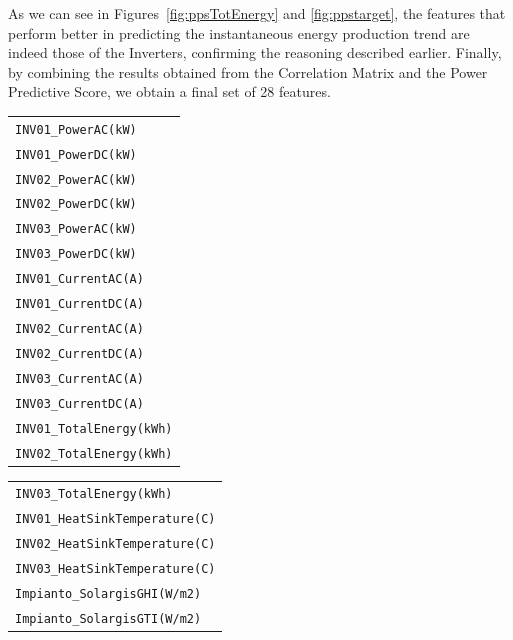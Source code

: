 As we can see in Figures~\ref{fig:ppsTotEnergy} and \ref{fig:ppstarget}, the features
that perform better in predicting the instantaneous energy production trend are
indeed those of the Inverters, confirming the reasoning described earlier.
Finally, by combining the results obtained from the Correlation Matrix and the
Power Predictive Score, we obtain a final set of 28 features.

%
\begin{table}[H]
	\begin{center}
		\begin{tabular}[c]{l|}
			\verb|INV01_PowerAC(kW)|      \\
			\verb|INV01_PowerDC(kW)|      \\
			\verb|INV02_PowerAC(kW)|      \\
			\verb|INV02_PowerDC(kW)|      \\
			\verb|INV03_PowerAC(kW)|      \\
			\verb|INV03_PowerDC(kW)|      \\
			\verb|INV01_CurrentAC(A)|     \\
			\verb|INV01_CurrentDC(A)|     \\
			\verb|INV02_CurrentAC(A)|     \\
			\verb|INV02_CurrentDC(A)|     \\
			\verb|INV03_CurrentAC(A)|     \\
			\verb|INV03_CurrentDC(A)|     \\
			\verb|INV01_TotalEnergy(kWh)| \\
			\verb|INV02_TotalEnergy(kWh)|
		\end{tabular}
		\begin{tabular}[c]{l}
			\verb|INV03_TotalEnergy(kWh)|       \\
			\verb|INV01_HeatSinkTemperature(C)| \\
			\verb|INV02_HeatSinkTemperature(C)| \\
			\verb|INV03_HeatSinkTemperature(C)| \\
			\verb|Impianto_SolargisGHI(W/m2)|   \\
			\verb|Impianto_SolargisGTI(W/m2)|   \\

\end{tabular}
\end{center}
\end{table}
